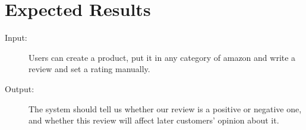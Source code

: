 \documentclass[12pt,a4paper]{article}
\begin{document}
\section{Expected Results}

\begin{description}
\item [Input:]  Users can create a product, put it in any category of amazon and write a review and set a rating manually.
\item [Output:] The system should tell us whether our review is a positive or negative one, and whether this review will affect later customers' opinion about it.
\end{description}
\end{document}
